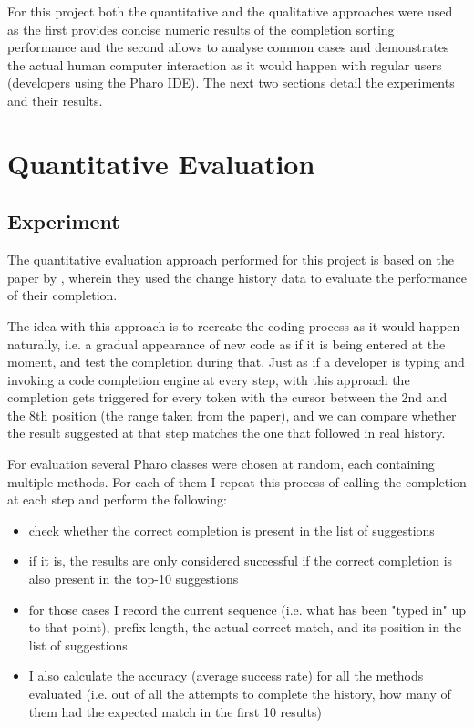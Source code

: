 For this project both the quantitative and the qualitative approaches were used as the first provides concise numeric results of the completion sorting performance and the second allows to analyse common cases and demonstrates the actual human computer interaction as it would happen with regular users (developers using the Pharo IDE). The next two sections detail the experiments and their results.

\section{Quantitative Evaluation}
\label{sec:Evaluation-Quantitative}
\subsection{Experiment}
The quantitative evaluation approach performed for this project is based on the paper by \cite{Robb08a}, wherein they used the change history data to evaluate the performance of their completion.

The idea with this approach is to recreate the coding process as it would happen naturally, i.e. a gradual appearance of new code as if it is being entered at the moment, and test the completion during that. Just as if a developer is typing and invoking a code completion engine at every step, with this approach the completion gets triggered for every token with the cursor between the 2nd and the 8th position (the range taken from the \cite{Robb08a} paper), and we can compare whether the result suggested at that step matches the one that followed in real history.

For evaluation several Pharo classes were chosen at random, each containing multiple methods. For each of them I repeat this process of calling the completion at each step and perform the following:
\begin{itemize}
    \item check whether the correct completion is present in the list of suggestions
    \item if it is, the results are only considered successful if the correct completion is also present in the top-10 suggestions
    \item for those cases I record the current sequence (i.e. what has been "typed in" up to that point), prefix length, the actual correct match, and its position in the list of suggestions
    \item I also calculate the accuracy (average success rate) for all the methods evaluated (i.e. out of all the attempts to complete the history, how many of them had the expected match in the first 10 results)
\end{itemize}

